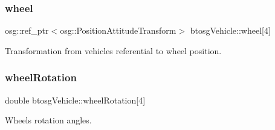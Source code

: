 \mbox{\label{classbtosgVehicle_a37edb4c28551037829ffd79c7bc315ba}} 
\subsubsection{\texorpdfstring{wheel}{wheel}}
{\footnotesize\ttfamily osg\+::ref\+\_\+ptr$<$osg\+::\+Position\+Attitude\+Transform$>$ btosg\+Vehicle\+::wheel\mbox{[}4\mbox{]}}



Transformation from vehicle\textquotesingle{}s referential to wheel position. 

\mbox{\label{classbtosgVehicle_a0a9cd6f2c9b0defc44cd5e2e8d597418}} 
\subsubsection{\texorpdfstring{wheel\+Rotation}{wheelRotation}}
{\footnotesize\ttfamily double btosg\+Vehicle\+::wheel\+Rotation\mbox{[}4\mbox{]}}



Wheels\textquotesingle{} rotation angles. 



